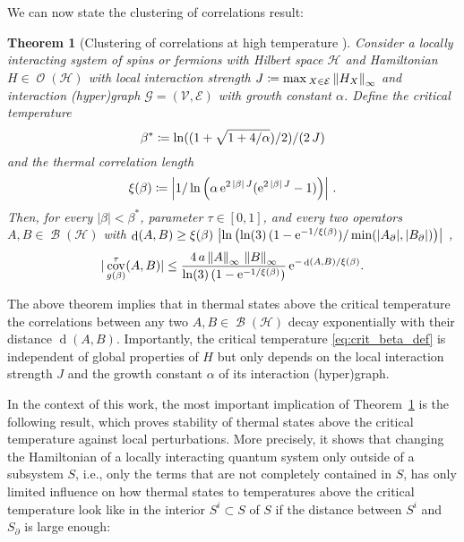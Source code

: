 \documentclass[a4paper,12pt,listof=totoc,index=totoc,bibliography=totoc,headsepline=false,headings=normal,BCOR16.153846mm,DIV12,headinclude,twoside,cleardoublepage=empty,numbers=noenddot,final]{scrreprt}
\theoremstyle{mystyle}
\numberwithin{equation}{section}
\numberwithin{figure}{section}
\numberwithin{lemma}{section}
\newtheorem{theorem}{Theorem}
\numberwithin{theorem}{section}
\numberwithin{corollary}{section}
\numberwithin{definition}{section}
\numberwithin{conjecture}{section}
\numberwithin{observation}{section}
\newcommand{\+}{\mkern2mu}
\newcommand{\coloneqq}{\mathrel{\vcentcolon\mkern-1.2mu=}} %
\renewcommand{\max}{\mathchoice{\operatorname*{max}}{\operatorname*{max}}{\mathrm{max}}{\mathrm{max}}} %
\renewcommand{\min}{\mathchoice{\operatorname*{min}}{\operatorname*{min}}{\mathrm{min}}{\mathrm{min}}}
\renewcommand{\H}{H}
\newcommand{\rhog}{g}
\newcommand{\animalc}{\alpha}
\newcommand{\Vset}{\mathcal{V}}
\newcommand{\Eset}{\mathcal{E}}
\newcommand{\norm}[2][]{
  \ifthenelse{\equal{#1}{}}
    {\left\| {#2} \right\|}
    {\ifthenelse{\equal{#1}{uinv}}
      {\left\vert\kern-0.25ex\left\vert\kern-0.25ex\left\vert {#2} \right\vert\kern-0.25ex\right\vert\kern-0.25ex\right\vert}
      {\left\| {#2} \right\|_{#1}}
    }
}
\newcommand{\e}{\mathrm{e}}
\DeclareMathOperator{\1}{\mathds{1}}
\DeclareMathOperator{\Bop}{\mathcal{B}}
\DeclareMathOperator{\Obs}{\mathcal{O}}
\DeclareMathOperator{\cov}{cov}
\DeclareMathOperator{\dist}{d}
\newcommand{\mc}[1]{\mathcal{#1}}
\newcommand{\mcH}{\mc{H}}
\newcommand{\mcG}{\mc{G}}
\begin{document}
We can now state the clustering of correlations result:
\begin{theorem}[Clustering of correlations at high temperature {\cite[Theorem~3 and 16]{Kliesch2013a}}] \label{thm:clustering}
  Consider a locally interacting system of spins or fermions with Hilbert space $\mcH$ and Hamiltonian $\H \in \Obs(\mcH)$ with \emph{local interaction strength} $J \coloneqq \max_{X\in\Eset} \norm[\infty]{\H_X}$ and interaction (hyper)graph $\mcG = (\Vset,\Eset)$ with growth constant $\animalc$.
  Define the \emph{critical temperature}
  \begin{equation}\label{eq:crit_beta_def}
    \beta^\ast \coloneqq \ln((1+\sqrt{1+4/\animalc})/2)/(2\,J) 
  \end{equation}
  and the \emph{thermal correlation length}
  \begin{equation} \label{eq:correlation_length_def}
    \xi(\beta) \coloneqq \left|1/\ln\left(\animalc\, \e^{2\,|\beta|\,J}(\e^{2\,|\beta|\,J}-1)\right)\right|  \, .
  \end{equation}
  Then, for every $|\beta|<\beta^\ast$, parameter $\tau \in [0,1]$, and every two operators $A,B \in \Bop(\mcH)$ with 
  $\dist(A, B) \geq \xi(\beta)\, \left|\ln\left(\ln(3)\, (1-\e^{-1/\xi(\beta)})/\min(|A_\partial |,|B_\partial |)\right)\right|$ ,
  \begin{equation} \label{eq:clustering} 
    |\cov^\tau_{\rhog(\beta)} (A, B)| \leq \frac{4\,a \norm{A}_\infty\, \norm{B}_\infty}{\ln(3)\, (1-\e^{-1/\xi(\beta)})}\,\e^{-\dist(A,B)/\xi(\beta)} .
  \end{equation}
\end{theorem}

The above theorem implies that in thermal states above the critical temperature the correlations between any two $A,B \in \Bop(\mcH)$ decay exponentially with their distance $\dist(A,B)$.
Importantly, the critical temperature \eqref{eq:crit_beta_def} is independent of global properties of $\H$ but only depends on the local interaction strength $J$ and the growth constant $\animalc$ of its interaction (hyper)graph.

In the context of this work, the most important implication of Theorem~\ref{thm:clustering} is the following result, which proves stability of thermal states above the critical temperature against local perturbations.
More precisely, it shows that changing the Hamiltonian of a locally interacting quantum system only outside of a subsystem $S$, i.e., only the terms that are not completely contained in $S$, has only limited influence on how thermal states to temperatures above the critical temperature look like in the interior $S^i \subset S$ of $S$ if the distance between $S^i$ and $S_\partial$ is large enough:
\end{document}
